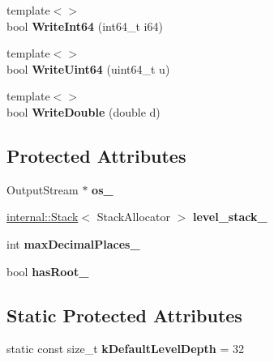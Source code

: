 \begin{DoxyCompactItemize}
\item 
{\footnotesize template$<$$>$ }\\bool {\bfseries Write\+Int64} (int64\+\_\+t i64)\hypertarget{classWriter_a3528a42394d50f3b92659de517433c85}{}\label{classWriter_a3528a42394d50f3b92659de517433c85}

\item 
{\footnotesize template$<$$>$ }\\bool {\bfseries Write\+Uint64} (uint64\+\_\+t u)\hypertarget{classWriter_a025b3d2ca07d539a7067575e95f5578d}{}\label{classWriter_a025b3d2ca07d539a7067575e95f5578d}

\item 
{\footnotesize template$<$$>$ }\\bool {\bfseries Write\+Double} (double d)\hypertarget{classWriter_af317e1d24249b8c68503a6253c703bd2}{}\label{classWriter_af317e1d24249b8c68503a6253c703bd2}

\end{DoxyCompactItemize}
\subsection*{Protected Attributes}
\begin{DoxyCompactItemize}
\item 
Output\+Stream $\ast$ {\bfseries os\+\_\+}\hypertarget{classWriter_a3a3f60140f78dd67b5274978fd3a33ff}{}\label{classWriter_a3a3f60140f78dd67b5274978fd3a33ff}

\item 
\hyperlink{classinternal_1_1Stack}{internal\+::\+Stack}$<$ Stack\+Allocator $>$ {\bfseries level\+\_\+stack\+\_\+}\hypertarget{classWriter_a9e6c13c06fc721dfd8486f17b9ff29de}{}\label{classWriter_a9e6c13c06fc721dfd8486f17b9ff29de}

\item 
int {\bfseries max\+Decimal\+Places\+\_\+}\hypertarget{classWriter_a3d4ef664c3cdf34a286b13d27adcdd4d}{}\label{classWriter_a3d4ef664c3cdf34a286b13d27adcdd4d}

\item 
bool {\bfseries has\+Root\+\_\+}\hypertarget{classWriter_affc6b9e0332b50bee0d33f8b1841c9a6}{}\label{classWriter_affc6b9e0332b50bee0d33f8b1841c9a6}

\end{DoxyCompactItemize}
\subsection*{Static Protected Attributes}
\begin{DoxyCompactItemize}
\item 
static const size\+\_\+t {\bfseries k\+Default\+Level\+Depth} = 32\hypertarget{classWriter_a9cb4caeb9d8971f305edff1d70e67acb}{}\label{classWriter_a9cb4caeb9d8971f305edff1d70e67acb}

\end{DoxyCompactItemize}


